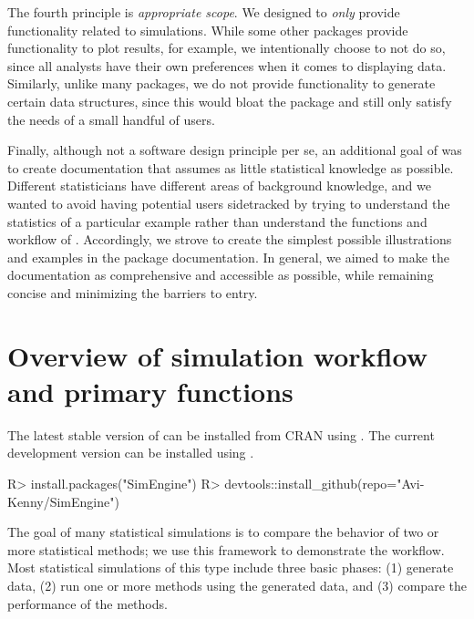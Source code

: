 The fourth principle is \textit{appropriate scope}. We designed  to \textit{only} provide functionality related to simulations. While some other packages provide functionality to plot results, for example, we intentionally choose to not do so, since all analysts have their own preferences when it comes to displaying data. Similarly, unlike many packages, we do not provide functionality to generate certain data structures, since this would bloat the package and still only satisfy the needs of a small handful of users.

Finally, although not a software design principle per se, an additional goal of  was to create documentation that assumes as little statistical knowledge as possible. Different statisticians have different areas of background knowledge, and we wanted to avoid having potential users sidetracked by trying to understand the statistics of a particular example rather than understand the functions and workflow of . Accordingly, we strove to create the simplest possible illustrations and examples in the package documentation. In general, we aimed to make the documentation as comprehensive and accessible as possible, while remaining concise and minimizing the barriers to entry.

\section{Overview of simulation workflow and primary functions} \label{sec:overview}

The latest stable version of  can be installed from CRAN using . The current development version can be installed using .

\begin{example}
R> install.packages("SimEngine")
R> devtools::install_github(repo="Avi-Kenny/SimEngine")
\end{example}

The goal of many statistical simulations is to compare the behavior of two or more statistical methods; we use this framework to demonstrate the  workflow. Most statistical simulations of this type include three basic phases: (1) generate data, (2) run one or more methods using the generated data, and (3) compare the performance of the methods.

